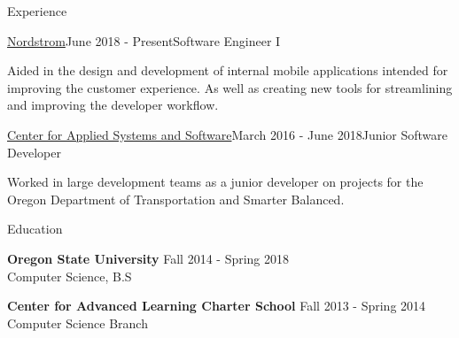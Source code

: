 \documentclass{resume} %
\begin{document}

\begin{rSection}{Experience}
  
  \begin{rSubsection}{\href{http://www.nordstrom.com/}{Nordstrom}}{June 2018 - Present}{Software Engineer I}{}
  \item Aided in the design and development of internal mobile applications intended for improving the customer experience. As well as creating new tools for streamlining and improving the developer workflow.
  \end{rSubsection}

  \begin{rSubsection}{\href{http://cass.oregonstate.edu/}{Center for Applied Systems and Software}}{March 2016 - June 2018}{Junior Software Developer}{}
  \item Worked in large development teams as a junior developer on projects for the Oregon  Department of Transportation and Smarter Balanced.
  \end{rSubsection}

\end{rSection}


\begin{rSection}{Education}

{\bf Oregon State University} \hfill {Fall 2014 - Spring 2018} 
\\ Computer Science, B.S

{\bf Center for Advanced Learning Charter School} \hfill {Fall 2013 - Spring 2014} 
\\ Computer Science Branch

\end{rSection}
\end{document}

